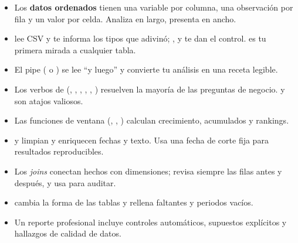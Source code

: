 \begin{resumen}
\begin{itemize}
  \item Los \textbf{datos ordenados} tienen una variable por columna, una
        observación por fila y un valor por celda. Analiza en largo,
        presenta en ancho.
  \item {} lee CSV y te informa los tipos que adivinó;
        ,  y  te dan el
        control.  es tu primera mirada a cualquier tabla.
  \item El pipe (\codigo{\%>\%} o \codigo{|>}) se lee ``y luego'' y
        convierte tu análisis en una receta legible.
  \item Los verbos de  (, ,
        , , ,
        ) resuelven la mayoría de las preguntas de
        negocio.  y  son atajos
        valiosos.
  \item Las funciones de ventana (, ,
        ) calculan crecimiento, acumulados y rankings.
  \item {} y  limpian y enriquecen fechas y
        texto. Usa una fecha de corte fija para resultados reproducibles.
  \item Los \emph{joins} conectan hechos con dimensiones; revisa siempre las
        filas antes y después, y usa  para auditar.
  \item {} cambia la forma de las tablas y rellena faltantes y
        periodos vacíos.
  \item Un reporte profesional incluye controles automáticos, supuestos
        explícitos y hallazgos de calidad de datos.
\end{itemize}
\end{resumen}

